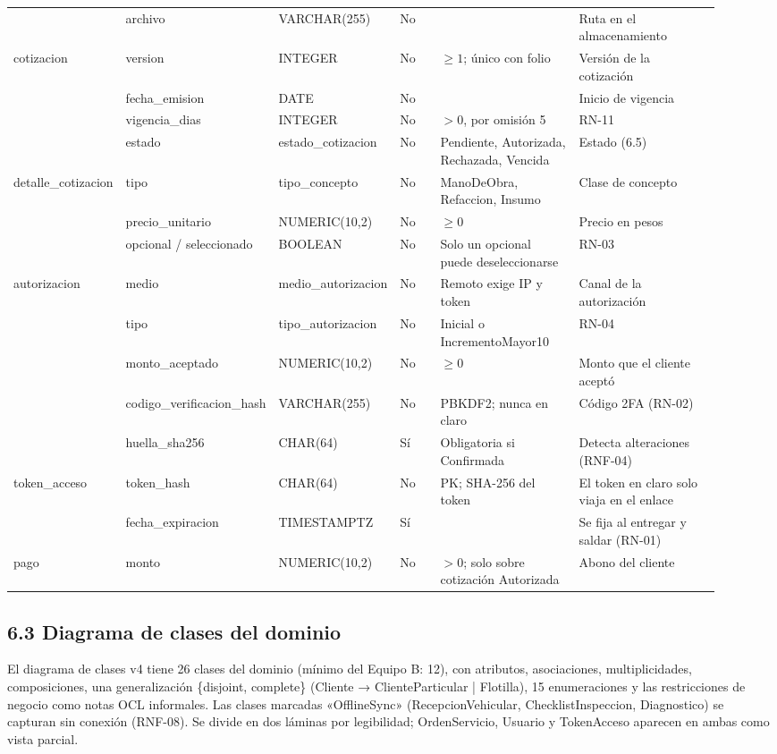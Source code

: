 {\begin{longtable}{@{}L{0.15\linewidth}L{0.17\linewidth}L{0.13\linewidth}L{0.06\linewidth}L{0.2\linewidth}L{0.21\linewidth}@{}}
 & archivo & VARCHAR(255) & No & & Ruta en el almacenamiento \\
cotizacion & version & INTEGER & No & $\geq 1$; único con folio & Versión de la cotización \\
 & fecha\_emision & DATE & No & & Inicio de vigencia \\
 & vigencia\_dias & INTEGER & No & $> 0$, por omisión 5 & RN-11 \\
 & estado & estado\_cotizacion & No & Pendiente, Autorizada, Rechazada, Vencida & Estado (6.5) \\
detalle\_cotizacion & tipo & tipo\_concepto & No & ManoDeObra, Refaccion, Insumo & Clase de concepto \\
 & precio\_unitario & NUMERIC(10,2) & No & $\geq 0$ & Precio en pesos \\
 & opcional / seleccionado & BOOLEAN & No & Solo un opcional puede deseleccionarse & RN-03 \\
autorizacion & medio & medio\_autorizacion & No & Remoto exige IP y token & Canal de la autorización \\
 & tipo & tipo\_autorizacion & No & Inicial o IncrementoMayor10 & RN-04 \\
 & monto\_aceptado & NUMERIC(10,2) & No & $\geq 0$ & Monto que el cliente aceptó \\
 & codigo\_verificacion\_hash & VARCHAR(255) & No & PBKDF2; nunca en claro & Código 2FA (RN-02) \\
 & huella\_sha256 & CHAR(64) & Sí & Obligatoria si Confirmada & Detecta alteraciones (RNF-04) \\
token\_acceso & token\_hash & CHAR(64) & No & PK; SHA-256 del token & El token en claro solo viaja en el enlace \\
 & fecha\_expiracion & TIMESTAMPTZ & Sí & & Se fija al entregar y saldar (RN-01) \\
pago & monto & NUMERIC(10,2) & No & $> 0$; solo sobre cotización Autorizada & Abono del cliente \\
\end{longtable}
}

\subsection{6.3 Diagrama de clases del
dominio}\label{diagrama-de-clases-del-dominio}

El diagrama de clases v4 tiene 26 clases del dominio (mínimo del Equipo B: 12), con atributos,
asociaciones, multiplicidades, composiciones, una generalización \{disjoint, complete\} (Cliente →
ClienteParticular | Flotilla), 15 enumeraciones y las restricciones de negocio como notas OCL
informales. Las clases marcadas «OfflineSync» (RecepcionVehicular, ChecklistInspeccion, Diagnostico) se
capturan sin conexión (RNF-08). Se divide en dos láminas por legibilidad; OrdenServicio, Usuario y
TokenAcceso aparecen en ambas como vista parcial.

